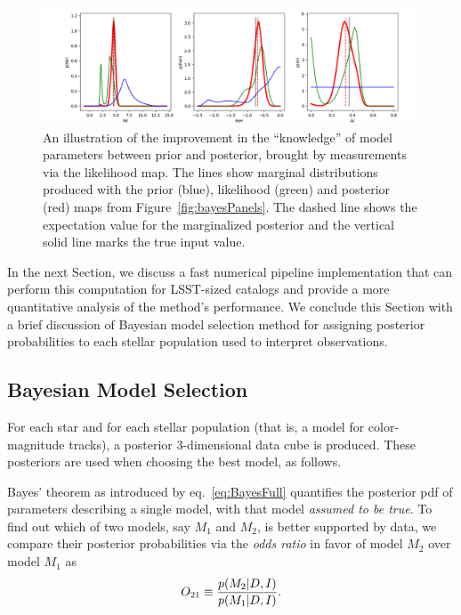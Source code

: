 \begin{figure}[t!]
\includegraphics[width=0.99\textwidth,angle=0]{figures/margPosteriors3D_ex1.png}
\caption{An illustration of the improvement in the ``knowledge'' of model parameters between prior and posterior,
brought by measurements via the likelihood map. The lines show marginal distributions produced with the
prior (blue), likelihood (green) and posterior (red) maps from Figure~\ref{fig:bayesPanels}. The dashed line shows the
expectation value for the marginalized posterior and the vertical solid line marks the true input value.}
\label{fig:margPost3D}
\end{figure}



In the next Section, we discuss a fast numerical pipeline implementation that can perform this computation for LSST-sized
catalogs and provide a more quantitative analysis of the method's performance.  We conclude this Section with a brief
discussion of Bayesian model selection method for assigning posterior probabilities to each stellar population used to interpret
observations. 


\subsection{Bayesian Model Selection} 

For each star and for each stellar population (that is, a model for color-magnitude tracks), a posterior
3-dimensional data cube is produced.  These posteriors are used when choosing the best model, as follows.

Bayes' theorem as introduced by eq.~\ref{eq:BayesFull} quantifies the posterior
pdf of parameters describing a single model, with that model {\it assumed to be true}.
To find out which of two models, say $M_1$ and $M_2$, is better supported by data, we
compare their posterior probabilities via the {\it odds ratio} in favor of model $M_2$ over
model $M_1$ as 
\begin{equation}
                  O_{21} \equiv { p(M_2|D,I) \over p(M_1|D,I) }.
\end{equation}     


